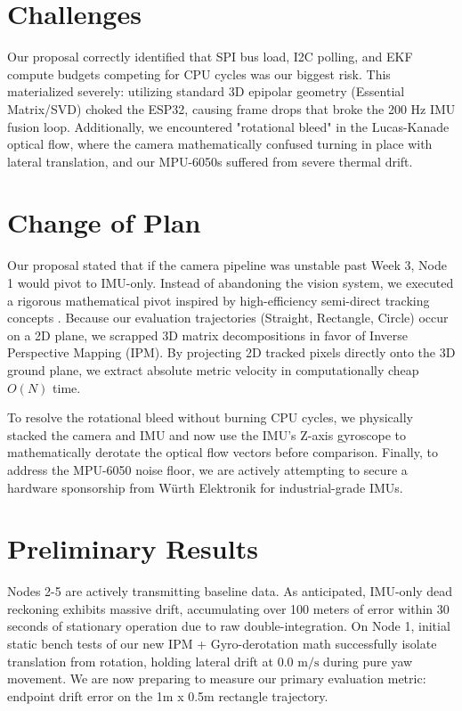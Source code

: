 \documentclass[sigconf,nonacm]{acmart}
\begin{document}
	\section{Challenges}
	Our proposal correctly identified that SPI bus load, I2C polling, and EKF compute budgets competing for CPU cycles was our biggest risk. This materialized severely: utilizing standard 3D epipolar geometry (Essential Matrix/SVD) choked the ESP32, causing frame drops that broke the 200 Hz IMU fusion loop. Additionally, we encountered "rotational bleed" in the Lucas-Kanade optical flow, where the camera mathematically confused turning in place with lateral translation, and our MPU-6050s suffered from severe thermal drift.
	
	\section{Change of Plan}
	Our proposal stated that if the camera pipeline was unstable past Week 3, Node 1 would pivot to IMU-only. Instead of abandoning the vision system, we executed a rigorous mathematical pivot inspired by high-efficiency semi-direct tracking concepts \cite{forster2014svo}. Because our evaluation trajectories (Straight, Rectangle, Circle) occur on a 2D plane, we scrapped 3D matrix decompositions in favor of Inverse Perspective Mapping (IPM). By projecting 2D tracked pixels directly onto the 3D ground plane, we extract absolute metric velocity in computationally cheap $O(N)$ time. 
	
	To resolve the rotational bleed without burning CPU cycles, we physically stacked the camera and IMU and now use the IMU's Z-axis gyroscope to mathematically derotate the optical flow vectors before comparison. Finally, to address the MPU-6050 noise floor, we are actively attempting to secure a hardware sponsorship from Würth Elektronik for industrial-grade IMUs.
	
	\section{Preliminary Results}
	Nodes 2-5 are actively transmitting baseline data. As anticipated, IMU-only dead reckoning exhibits massive drift, accumulating over 100 meters of error within 30 seconds of stationary operation due to raw double-integration. On Node 1, initial static bench tests of our new IPM + Gyro-derotation math successfully isolate translation from rotation, holding lateral drift at $0.0 \text{ m/s}$ during pure yaw movement. We are now preparing to measure our primary evaluation metric: endpoint drift error on the 1m x 0.5m rectangle trajectory.
	
\end{document}

